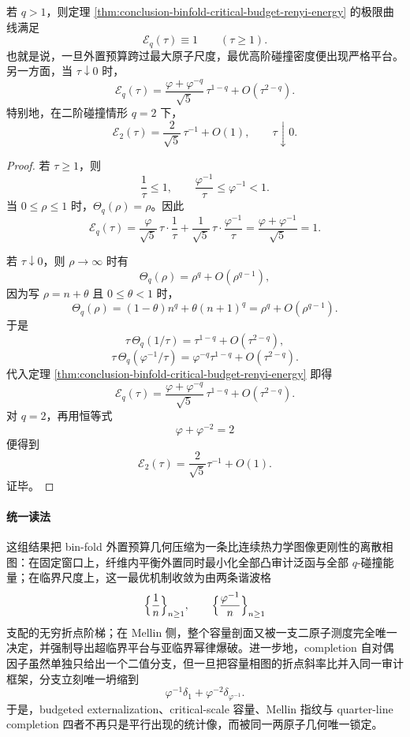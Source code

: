 \begin{theorem}[超临界精确平台与亚临界幂律爆破]\label{thm:conclusion-supercritical-plateau-subcritical-power-law}
若 \(q>1\)，则定理 \ref{thm:conclusion-binfold-critical-budget-renyi-energy} 的极限曲线满足
\[
\mathcal E_q(\tau)\equiv 1
\qquad (\tau\ge 1).
\]
也就是说，一旦外置预算跨过最大原子尺度，最优高阶碰撞密度便出现严格平台。另一方面，当 \(\tau\downarrow 0\) 时，
\[
\mathcal E_q(\tau)
=
\frac{\varphi+\varphi^{-q}}{\sqrt5}\,\tau^{1-q}
+
O(\tau^{2-q}).
\]
特别地，在二阶碰撞情形 \(q=2\) 下，
\[
\mathcal E_2(\tau)
=
\frac{2}{\sqrt5}\,\tau^{-1}+O(1),
\qquad
\tau\downarrow 0.
\]
\end{theorem}
\begin{proof}
若 \(\tau\ge 1\)，则
\[
\frac1\tau\le 1,
\qquad
\frac{\varphi^{-1}}{\tau}\le \varphi^{-1}<1.
\]
当 \(0\le \rho\le 1\) 时，\(\Theta_q(\rho)=\rho\)。因此
\[
\mathcal E_q(\tau)
=
\frac{\varphi}{\sqrt5}\,\tau\cdot \frac1\tau
+
\frac1{\sqrt5}\,\tau\cdot \frac{\varphi^{-1}}{\tau}
=
\frac{\varphi+\varphi^{-1}}{\sqrt5}
=1.
\]

若 \(\tau\downarrow 0\)，则 \(\rho\to\infty\) 时有
\[
\Theta_q(\rho)=\rho^q+O(\rho^{q-1}),
\]
因为写 \(\rho=n+\theta\) 且 \(0\le \theta<1\) 时，
\[
\Theta_q(\rho)=(1-\theta)n^q+\theta(n+1)^q
=
\rho^q+O(\rho^{q-1}).
\]
于是
\[
\tau\,\Theta_q(1/\tau)=\tau^{1-q}+O(\tau^{2-q}),
\]
\[
\tau\,\Theta_q(\varphi^{-1}/\tau)=\varphi^{-q}\tau^{1-q}+O(\tau^{2-q}).
\]
代入定理 \ref{thm:conclusion-binfold-critical-budget-renyi-energy} 即得
\[
\mathcal E_q(\tau)
=
\frac{\varphi+\varphi^{-q}}{\sqrt5}\,\tau^{1-q}
+
O(\tau^{2-q}).
\]
对 \(q=2\)，再用恒等式
\[
\varphi+\varphi^{-2}=2
\]
便得到
\[
\mathcal E_2(\tau)=\frac{2}{\sqrt5}\tau^{-1}+O(1).
\]
证毕。
\end{proof}

\paragraph{统一读法}
这组结果把 bin-fold 外置预算几何压缩为一条比连续热力学图像更刚性的离散相图：在固定窗口上，纤维内平衡外置同时最小化全部凸审计泛函与全部 \(q\)-碰撞能量；在临界尺度上，这一最优机制收敛为由两条谐波格
\[
\Bigl\{\frac1n\Bigr\}_{n\ge 1},
\qquad
\Bigl\{\frac{\varphi^{-1}}{n}\Bigr\}_{n\ge 1}
\]
支配的无穷折点阶梯；在 Mellin 侧，整个容量剖面又被一支二原子测度完全唯一决定，并强制导出超临界平台与亚临界幂律爆破。进一步地，completion 自对偶因子虽然单独只给出一个二值分支，但一旦把容量相图的折点斜率比并入同一审计框架，分支立刻唯一坍缩到
\[
\varphi^{-1}\delta_1+\varphi^{-2}\delta_{\varphi^{-1}}.
\]
于是，budgeted externalization、critical-scale 容量、Mellin 指纹与 quarter-line completion 四者不再只是平行出现的统计像，而被同一两原子几何唯一锁定。

\endinput

